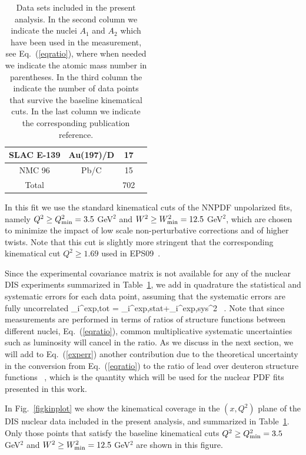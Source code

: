 \begin{table}[t]
\begin{tabular}{c c c c}
\hline
  SLAC E-139 & Au(197)/D & 17 & \cite{PhysRevD.49.4348}\\
\hline
 NMC 96 & Pb/C & 15 & \cite{Arneodo:1996rv}\\
 \hline
 \hline
 Total & & 702 & \\
\hline
\end{tabular}
\caption{\small Data sets included in the present analysis.
  In the second column we indicate the nuclei $A_1$ and $A_2$ which
  have been used in the measurement, see Eq.~(\ref{eqratio}),
  where when needed we indicate the atomic mass
  number in  parentheses.
  In the third column the indicate the number of data points that
  survive the baseline kinematical cuts.
  In the last column we indicate the corresponding publication reference.
}
\label{dataset}
\end{table}


In this fit we use the standard kinematical cuts of the NNPDF unpolarized
fits, namely $Q^2 \ge Q^2_{\rm min}=3.5$ GeV$^2$ and $W^2 \ge W^2_{\rm min}=12.5$
GeV$^2$, which are chosen to minimize the impact of low scale non-perturbative
corrections and of higher twists.
%
Note that this cut is slightly more stringent that the
corresponding kinematical cut $Q^2 \ge 1.69$  used in
EPS09~\cite{Eskola:2009uj}.



Since the experimental covariance matrix is not available for any of
the nuclear DIS experiments summarized in Table~\ref{dataset},
we add in quadrature the statistical and systematic errors for each
data point, assuming that the systematic errors are fully uncorrelated
\be
\label{experr}
\sigma_i^{\rm exp,tot} = \lp \sigma_i^{\rm exp,stat}+\sigma_i^{\rm exp,sys}\rp^2 \, .
\ee
Note that since measurements are performed in terms of ratios of
structure functions between different nuclei, Eq.~(\ref{eqratio}),
common multiplicative systematic uncertainties such as luminosity will
cancel in the ratio.
%
As we discuss in the next section, we will add to
Eq.~(\ref{experr}) another contribution due to the theoretical
uncertainty in the conversion from Eq.~(\ref{eqratio}) to the ratio
of lead over deuteron structure functions
\be
\label{eqratio2}
 \, ,
\ee
which is the quantity which will be used for the nuclear
PDF fits presented in this work.

In Fig.~\ref{figkinplot} we show the
kinematical coverage in the $(x,Q^2)$ plane
  of the DIS nuclear data included in the present analysis,
  and summarized in Table~\ref{dataset}.
  Only those points that satisfy the baseline kinematical
  cuts $Q^2 \ge Q^2_{\rm min}=3.5$ GeV$^2$ and $W^2 \ge W^2_{\rm min}=12.5$
GeV$^2$ are shown in this figure.

